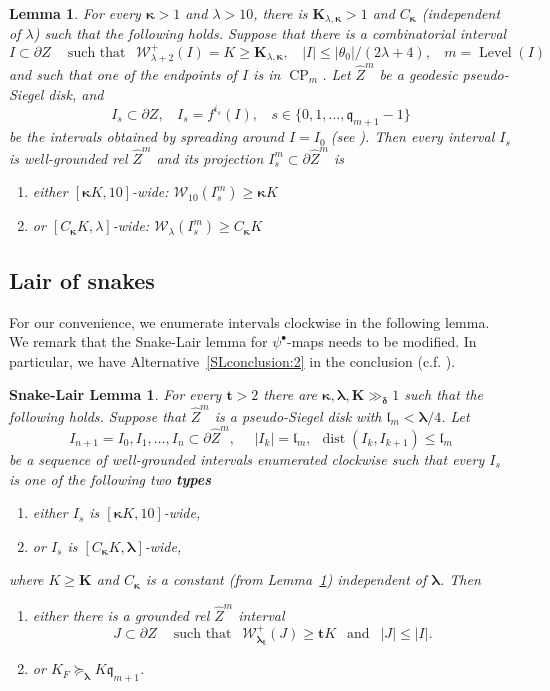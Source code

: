 \documentclass{amsart}
\renewcommand{\sp}{{\ \ }}
\newcommand{\1}{{\mathbb 1 }}
\newcommand{\blambda}{{\boldsymbol\lambda}}
\newcommand{\bkappa}{{\boldsymbol\kappa}}
\newcommand{\Width}{{\mathcal W}}
\newcommand{\wZ}{{\widehat Z}}
\newcommand{\bK}{{\mathbf K}}
\newcommand{\bbt}{{\mathbf t}}
\newcommand{\Level}{\operatorname{Level}}
\newcommand{\qq}{\mathfrak{q}}
\newcommand{\length}{{\mathfrak l}}
\newtheorem{lem}[thm]{Lemma}
\newtheorem{lairlmm}[thm]{Snake-Lair Lemma}
\theoremstyle{remark}
\numberwithin{equation}{section}
\theoremstyle{definition}
\newcommand{\dist}{\operatorname{dist}}
\newcommand{\CP}{{\operatorname{CP}}}
\newcommand{\bdelta}{{\boldsymbol{ \delta}}}
\begin{document}
\begin{lem}
\label{lem:SpredAroundWidth}
For every $\bkappa>1$ and $\lambda>10$, there is $\bK_{\lambda,\bkappa}>1$ and $C_\bkappa$ (independent of $\lambda$) such that the following holds. Suppose that there is a combinatorial interval \[I\subset\partial Z\sp\sp \text{ such that }
\sp\Width^+_{\lambda+2}(I)=K \ge \bK_{\lambda,\bkappa},\sp\sp |I|\le |\theta_0| / (2\lambda+4),\sp\sp m =\Level(I)\]
and such that one of the endpoints of $I$ is in $\CP_m$. Let $\wZ^m$ be a geodesic pseudo-Siegel disk, and \[ I_s\subset \partial Z,\sp\sp I_s=f^{i_s}(I),\sp\sp s\in \{0,1,\dots, \qq_{m+1}-1\}\] be the intervals obtained by spreading around $I=I_0$ (see \cite[\S 2.1.5]{DL22}). Then every interval $I_s$ is well-grounded rel $\wZ^{m}$ and its projection $I^m_s\subset \partial \wZ^m$ is  
\begin{enumerate}
\item\label{item:1:lem:SpredAroundWidth} either $[\bkappa K,10]$-wide: $\Width_{10}(I^m_s)\ge \bkappa K$ 
\item\label{item:2:lem:SpredAroundWidth} or $[ C_{\bkappa} K,\lambda]$-wide: $\Width_{\lambda}(I^m_s)\ge C_{\bkappa} K$ 
\end{enumerate} 
\end{lem}

\subsection{Lair of snakes}
For our convenience, we enumerate intervals clockwise in the following lemma. We remark that the Snake-Lair lemma for $\psi^\bullet$-maps needs to be modified. In particular, we have Alternative~\ref{SLconclusion:2} in the conclusion (c.f. \cite[Lemma 8.6]{DL22}). 
\begin{lairlmm}
\label{lem:Hive Lemma}
For every $\bbt>2$ there are $\bkappa,\blambda,\bK\gg_{\bdelta}1$ such that the following holds. Suppose that $\wZ^m$ is a pseudo-Siegel disk with $\length_m< \blambda/4$. Let \[I_{n+1}=I_0, I_1,\dots , I_n\subset \partial \wZ^m, \sp\sp\sp |I_k| = \length_m,\sp  \dist(I_k, I_{k+1})\le \length_m\]
be a sequence of well-grounded intervals enumerated clockwise such that every $I_s$ is one of the following two {\bf types}
\begin{enumerate}
\item either $I_s$ is $[\bkappa K,10]$-wide, \label{case:I_k:1}
\item or $I_s$ is $[ C_{\bkappa} K,\blambda]$-wide,\label{case:I_k:2}
\end{enumerate} 
where $K\ge \bK$ and $C_\bkappa$ is a constant (from Lemma~\ref{lem:SpredAroundWidth}) independent of $\blambda$. Then 
   \begin{enumerate}[label=(\roman*)]
    \item either there is a grounded rel $\wZ^m$ interval \[J\subset \partial Z \sp\sp \text{ such that } \sp \Width^+_{\blambda_\bbt} (J) \ge \bbt K \sp \text{ and }\sp |J|\le |I|.\label{SLconclusion:1}
\]
\item or $K_F \succeq_\blambda K \qq_{m+1}$. \label{SLconclusion:2}
\end{enumerate}
\end{lairlmm}
\end{document}
